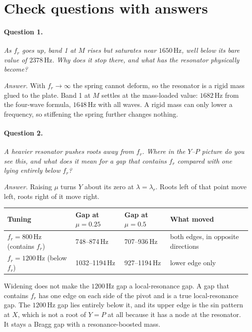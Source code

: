 \section{Check questions with answers}

\paragraph{Question 1.} \emph{As $f_r$ goes up, band 1 at $M$ rises but saturates
near $1650\,\mathrm{Hz}$, well below its bare value of $2378\,\mathrm{Hz}$. Why does
it stop there, and what has the resonator physically become?}

\emph{Answer.} With $f_r \to \infty$ the spring cannot deform, so the resonator is
a rigid mass glued to the plate. Band 1 at $M$ settles at the mass-loaded value:
$1682\,\mathrm{Hz}$ from the four-wave formula, $1648\,\mathrm{Hz}$ with all waves.
A rigid mass can only lower a frequency, so stiffening the spring further changes
nothing.

\paragraph{Question 2.} \emph{A heavier resonator pushes roots away from $f_r$.
Where in the $Y$--$P$ picture do you see this, and what does it mean for a gap that
contains $f_r$ compared with one lying entirely below $f_r$?}

\emph{Answer.} Raising $\mu$ turns $Y$ about its zero at $\lambda = \lambda_r$.
Roots left of that point move left, roots right of it move right.
\begin{center}
\begin{tabular}{|p{}|l|l|p{}|}
\hline
Tuning & Gap at $\mu = 0.25$ & Gap at $\mu = 0.5$ & What moved \\
\hline
$f_r = 800\,\mathrm{Hz}$ (contains $f_r$) & 748--874\,Hz & 707--936\,Hz & both edges, in opposite directions \\
$f_r = 1200\,\mathrm{Hz}$ (below $f_r$) & 1032--1194\,Hz & 927--1194\,Hz & lower edge only \\
\hline
\end{tabular}
\end{center}
Widening does not make the $1200\,\mathrm{Hz}$ gap a local-resonance gap. A gap that
contains $f_r$ has one edge on each side of the pivot and is a true local-resonance
gap. The $1200\,\mathrm{Hz}$ gap lies entirely below it, and its upper edge is the
sin pattern at $X$, which is not a root of $Y = P$ at all because it has a node at
the resonator. It stays a Bragg gap with a resonance-boosted mass.

